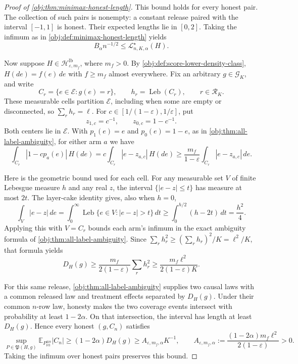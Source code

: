 \begin{proof}[Proof of \cref{obj:thm:minimax-honest-length}]
This bound holds for every honest pair. The collection of such pairs is nonempty: a constant release paired with the interval \([-1,1]\) is honest. Their expected lengths lie in \([0,2]\). Taking the infimum as in \cref{obj:def:minimax-honest-length} yields
\[
B_\alpha n^{-1/2}\leq\mathcal L^\star_{n,K,\alpha}(H).
\]

Now suppose \(H\in\mathcal H^{\mathrm{lb}}_{\varepsilon,m_f}\), where \(m_f>0\). By \cref{obj:def:score-lower-density-class}, \(H(de)=f(e)\,de\) with \(f\geq m_f\) almost everywhere. Fix an arbitrary \(g\in\mathcal G_K\), and write
\[
C_r=\{e\in\mathcal E:g(e)=r\},\qquad
h_r=\operatorname{Leb}(C_r),\qquad r\in\mathcal R_K.
\]
These measurable cells partition \(\mathcal E\), including when some are empty or disconnected, so \(\sum_rh_r=\ell\). For \(c\in[1/(1-\varepsilon),1/\varepsilon]\), put
\[
z_{1,c}=c^{-1},\qquad z_{0,c}=1-c^{-1}.
\]
Both centers lie in \(\mathcal E\). With \(p_1(e)=e\) and \(p_0(e)=1-e\), as in \cref{obj:thm:all-label-ambiguity}, for either arm \(a\) we have
\[
\int_{C_r}|1-cp_a(e)|\,H(de)
=c\int_{C_r}|e-z_{a,c}|\,H(de)
\geq\frac{m_f}{1-\varepsilon}
       \int_{C_r}|e-z_{a,c}|\,de.
\]

Here is the geometric bound used for each cell. For any measurable set \(V\) of finite Lebesgue measure \(h\) and any real \(z\), the interval \(\{|e-z|\leq t\}\) has measure at most \(2t\). The layer-cake identity gives, also when \(h=0\),
\[
\int_V|e-z|\,de
=\int_0^\infty\operatorname{Leb}\{e\in V:|e-z|>t\}\,dt
\geq\int_0^{h/2}(h-2t)\,dt
=\frac{h^2}{4}.
\]
Applying this with \(V=C_r\) bounds each arm’s infimum in the exact ambiguity formula of \cref{obj:thm:all-label-ambiguity}. Since \(\sum_rh_r^2\geq(\sum_rh_r)^2/K=\ell^2/K\), that formula yields
\[
D_H(g)\geq
\frac{m_f}{2(1-\varepsilon)}\sum_r h_r^2
\geq\frac{m_f\ell^2}{2(1-\varepsilon)K}.
\]

For this same release, \cref{obj:thm:all-label-ambiguity} supplies two causal laws with a common released law and treatment effects separated by \(D_H(g)\). Under their common \(n\)-row law, honesty makes the two coverage events intersect with probability at least \(1-2\alpha\). On that intersection, the interval has length at least \(D_H(g)\). Hence every honest \((g,C_n)\) satisfies
\[
\sup_{P\in\mathfrak P(H,g)}
\mathbb E_{P_{\mathrm{rel}}^{\otimes n}}|C_n|
\geq(1-2\alpha)D_H(g)
\geq A_{\varepsilon,m_f,\alpha}K^{-1},
\qquad
A_{\varepsilon,m_f,\alpha}
:=\frac{(1-2\alpha)m_f\ell^2}{2(1-\varepsilon)}>0.
\]
Taking the infimum over honest pairs preserves this bound. %


\end{proof}
